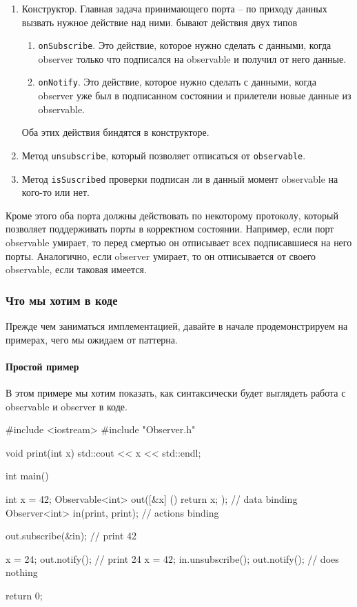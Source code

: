 \begin{enumerate}
\item Конструктор.
Главная задача принимающего порта -- по приходу данных вызвать нужное действие над ними.
бывают действия двух типов
\begin{enumerate}
\item \verb"onSubscribe".
Это действие, которое нужно сделать с данными, когда observer только что подписался на observable и получил от него данные.

\item \verb"onNotify".
Это действие, которое нужно сделать с данными, когда observer уже был в подписанном состоянии и прилетели новые данные из observable.
\end{enumerate}
Оба этих действия биндятся в конструкторе.

\item Метод \verb"unsubscribe", который позволяет отписаться от \verb"observable".

\item Метод \verb"isSuscribed" проверки подписан ли в данный момент observable на кого-то или нет.
\end{enumerate}

Кроме этого оба порта должны действовать по некоторому протоколу, который позволяет поддерживать порты в корректном состоянии.
Например, если порт observable умирает, то перед смертью он отписывает всех подписавшиеся на него порты.
Аналогично, если observer умирает, то он отписывается от своего observable, если таковая имеется.

\subsubsection{Что мы хотим в коде}

Прежде чем заниматься имплементацией, давайте в начале продемонстрируем на примерах, чего мы ожидаем от паттерна.

\paragraph{Простой пример}

В этом примере мы хотим показать, как синтаксически будет выглядеть работа с observable и observer в коде.
\begin{cppcode}
#include <iostream>
#include "Observer.h"

void print(int x) {
  std::cout << x << std::endl;
}

int main() {
  int x = 42;
  Observable<int> out([&x] () { return x; }); // data binding
  Observer<int> in(print, print); // actions binding
  
  out.subscribe(&in); // print 42
  
  x = 24;
  out.notify();  // print 24
  x = 42;
  in.unsubscribe();
  out.notify(); // does nothing
 
  return 0;
}
\end{cppcode}

